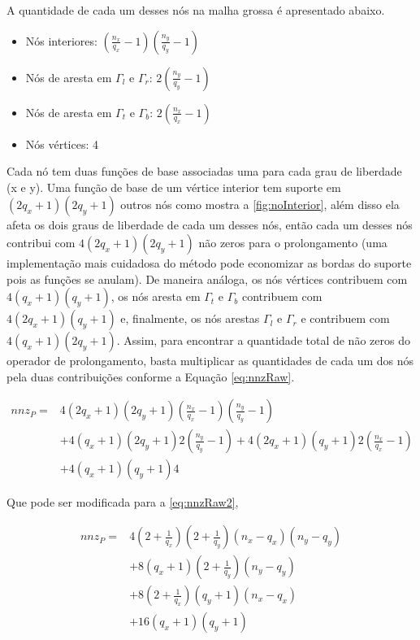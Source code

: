 A quantidade de cada um desses nós na malha grossa é apresentado abaixo.

\begin{itemize}
    \item Nós interiores: $(\frac{n_x}{q_x} - 1) (\frac{n_y}{q_y} - 1)$
    \item Nós de aresta em $\Gamma_l$ e $\Gamma_r$: $2 ( \frac{n_y}{q_y} - 1)$
    \item Nós de aresta em $\Gamma_t$ e $\Gamma_b$: $2 ( \frac{n_x}{q_x} - 1)$
    \item Nós vértices: 4 
\end{itemize}


Cada nó tem duas funções de base associadas uma para cada grau de liberdade (x e y). Uma função de base de um vértice interior tem suporte em $(2q_x+1)(2q_y+1)$ outros nós como mostra a \ref{fig:noInterior}, além disso ela afeta os dois graus de liberdade de cada um desses nós, então cada um desses nós contribui com $4(2q_x+1)(2q_y+1)$ não zeros para o prolongamento (uma implementação mais cuidadosa do método pode economizar as bordas do suporte pois as funções se anulam). De maneira análoga, os nós vértices contribuem com $ 4 (q_x+1)(q_y+1)$, os nós aresta em $\Gamma_t$ e $\Gamma_b$ contribuem com $ 4 (2q_x+1)(q_y+1) $ e, finalmente, os nós arestas  $\Gamma_l$ e $\Gamma_r$ e contribuem com $ 4(q_x+1)(2q_y+1) $. Assim, para encontrar a quantidade total de não zeros do operador de prolongamento, basta multiplicar as quantidades de cada um dos nós pela duas contribuições conforme a Equação \eqref{eq:nnzRaw}. 


\begin{equation} \label{eq:nnzRaw}
\begin{aligned}
    nnz_P = & 4(2q_x+1)(2q_y+1)  (\frac{n_x}{q_x} - 1) (\frac{n_y}{q_y} - 1)   \\ 
            & + 4 (q_x+1)(2q_y+1)  2 ( \frac{n_y}{q_y} - 1) +  4 (2q_x+1)(q_y+1)  2 (\frac{n_x}{q_x} - 1) \\
            & +  4(q_x+1)(q_y+1) 4 
\end{aligned}
\end{equation}

Que pode ser modificada para a \eqref{eq:nnzRaw2},

\begin{equation} \label{eq:nnzRaw2}
\begin{aligned}
    nnz_P = &   4 (2+\frac{1}{q_x})(2 + \frac{1}{q_y})  (n_x - q_x) (n_y - q_y) \\ 
            & + 8 (q_x+1)(2 + \frac{1}{q_y})  (n_y - q_y) \\
            & + 8 (2+\frac{1}{q_x})(q_y+1) (n_x - q_x) \\
            & + 16 (q_x+1)(q_y+1)  
\end{aligned}
\end{equation}

